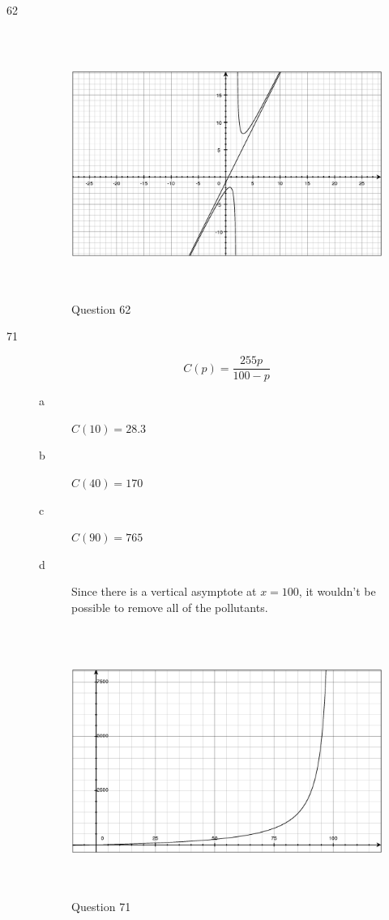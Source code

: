 \documentclass[fleqn,addpoints]{exam}
\begin{document}
\begin{description}
\item[62]
\begin{figure}[H]
  \centering
  \includegraphics[width=12.25cm,height=8.75cm]{question62.eps}
  \caption*{Question 62}
\end{figure}

\item[71]
\[
  C(p) = \dfrac{255p}{100-p}
\]
\begin{description}

\item[a] $C(10) = 28.3$
\item[b] $C(40) = 170$
\item[c] $C(90) = 765$
\item[d] Since there is a vertical asymptote at $x=100$, it wouldn't be possible to remove all of the pollutants.

\end{description}

\begin{figure}[H]
  \centering
  \includegraphics[width=12.25cm,height=8.75cm]{question71.eps}
  \caption*{Question 71}
\end{figure}


\end{description}
\end{document}
